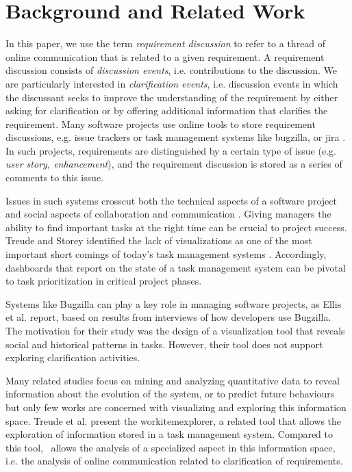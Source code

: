 \section{Background and Related Work}
In this paper, we use the term \emph{requirement discussion} to refer to a thread of online communication that is related to a given requirement. 
A requirement discussion consists of \emph{discussion events}, i.e. contributions to the discussion.
We are particularly interested in \emph{clarification events}, i.e. discussion events in which the discussant seeks to improve the understanding of the requirement by either asking for clarification or by offering additional information that clarifies the requirement.
Many software projects use online tools to store requirement discussions, e.g. issue trackers or task management systems like bugzilla, or jira \cite{Ernst2012}. 
In such projects, requirements are distinguished by a certain type of issue (e.g. \emph{user story, enhancement}), and the requirement discussion is stored as a series of comments to this issue.

Issues in such systems crosscut both the technical aspects of a software project and social aspects of collaboration and communication \cite{Kraut1995}. 
Giving managers the ability to find important tasks at the right time can be crucial to project success.
Treude and Storey identified the lack of visualizations as one of the most important short comings of today's task management systems \cite{Treude2010}. 
Accordingly, dashboards that report on the state of a task management system can be pivotal to task prioritization in critical project phases.

Systems like Bugzilla can play a key role in managing software projects, as Ellis et al. \cite{Ellis2007} report, based on results from interviews of how developers use Bugzilla. 
The motivation for their study was the design of a visualization tool that reveals social and historical patterns in tasks.
However, their tool does not support exploring clarification activities.

Many related studies focus on mining and analyzing quantitative data to reveal information about the evolution of the system, or to predict future behaviours but only few works are concerned with visualizing and exploring this information space. 
Treude et al. \cite{Treude2012} present the workitemexplorer, a related tool that allows the exploration of information stored in a task management system.
Compared to this tool, \viss\ allows the analysis of a specialized aspect in this information space, i.e. the analysis of online communication related to clarification of requirements. 